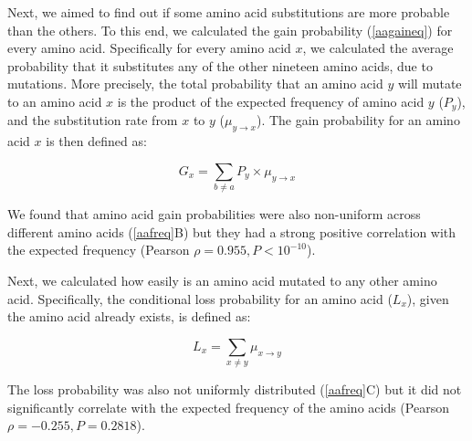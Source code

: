 \documentclass[12pt,a4paper]{article}
\begin{document}
Next, we aimed to find out if some amino acid substitutions are more probable than the others. To this end, we calculated the gain probability (\autoref{aagaineq}) for every amino acid. Specifically for every amino acid $x$, we calculated the average probability that it substitutes any of the other nineteen amino acids, due to mutations. More precisely, the total probability that an amino acid $y$ will mutate to an amino acid $x$ is the product of the expected frequency of amino acid $y$ ($P_y$), and the substitution rate from $x$ to $y$ ($\mu_{y\to x}$). The gain probability for an amino acid $x$ is then defined as:

\begin{equation}
G_x = \sum_{b \neq a} P_y \times \mu_{y\to x}
\label{aagaineq}
\end{equation}

We found that amino acid gain probabilities were also non-uniform across different amino acids (\autoref{aafreq}{\color{blue}B}) but they had a strong positive correlation with the expected frequency (Pearson $\rho = 0.955, P<10^{-10}$).

Next, we calculated how easily is an amino acid mutated to any other amino acid. Specifically, the conditional loss probability for an amino acid ($L_x$), given the amino acid already exists, is defined as:

\begin{equation}
L_x = \sum_{x \neq y} \mu_{x\to y}
\label{aalosseq}
\end{equation}


The loss probability was also not uniformly distributed (\autoref{aafreq}{\color{blue}C}) but it did not significantly correlate with the expected frequency of the amino acids (Pearson $\rho = -0.255, P = 0.2818$).
\end{document}
